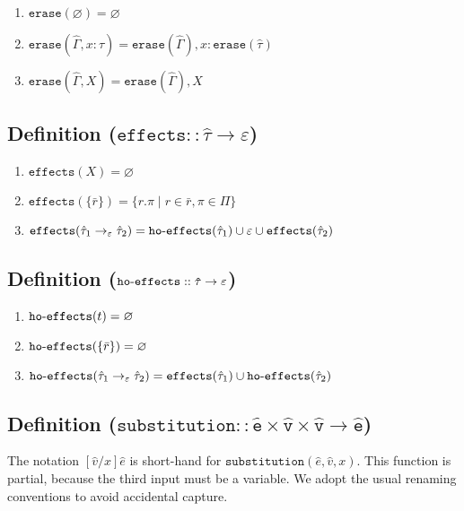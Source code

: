 \documentclass{llncs}
\newcommand{\keywadj}[1]{\mathtt{#1}}
\newcommand{\kwa}[1]{\keywadj{ #1 }}
\newcommand{\hyphen}{\hbox{-}}
\newcommand{\fx}[1]{ \kwa{effects}(#1) }
\newcommand{\hofx}[1]{ \kwa{ho \hyphen effects}(#1) }
\newcommand{\erase}[1]{
	\keywadj{erase}(#1)
}
\begin{document}
\begin{enumerate}
	\item $\erase{\varnothing} = \varnothing$
	\item $\erase{\hat \Gamma, x: \hat \tau} = \erase{\hat \Gamma}, x: \erase{\hat \tau}$
	\item $\erase{\hat \Gamma, X} = \erase{\hat \Gamma}, X$
\end{enumerate}


\subsection*{Definition ($\kwa{effects :: \hat \tau \rightarrow \varepsilon}$)}

\begin{enumerate}
	\item $\fx{X} = \varnothing$
	\item $\fx{\{ \bar r \}} = \{ r.\pi \mid r \in \bar r, \pi \in \Pi \}$
	\item $\fx{\hat \tau_1 \rightarrow_{\varepsilon} \hat \tau_2} = \kwa{ho \hyphen effects}(\hat \tau_1) \cup \varepsilon \cup \kwa{effects}(\hat \tau_2)$
\end{enumerate}

\subsection*{Definition ($\kwa{ho \hyphen effects :: \hat \tau \rightarrow \varepsilon}$)}

\begin{enumerate}
	\item $\hofx{t} = \varnothing$
	\item $\hofx{\{ \bar r \}} = \varnothing$
	\item $\hofx{\hat \tau_1 \rightarrow_{\varepsilon} \hat \tau_2} = \kwa{effects}(\hat \tau_1) \cup \kwa{ho \hyphen effects}(\hat \tau_2)$
\end{enumerate}

\subsection*{Definition ($\kwa{substitution :: \hat e \times \hat v \times \hat v \rightarrow \hat e}$)}

The notation $[\hat v/x]\hat e$ is short-hand for $\kwa{substitution}(\hat e, \hat v, x)$. This function is partial, because the third input must be a variable. We adopt the usual renaming conventions to avoid accidental capture.
\end{document}
